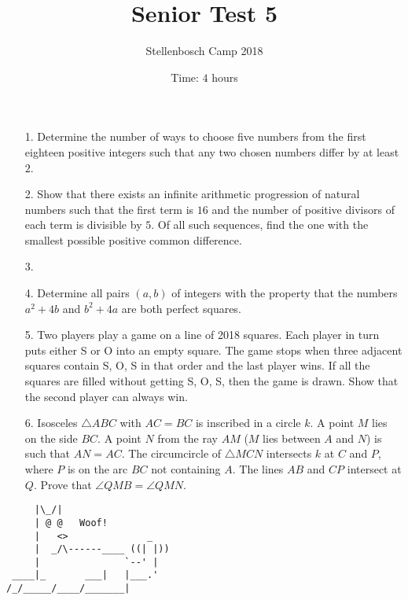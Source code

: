 \documentclass[a4paper, 12pt]{article}
\title{Senior Test 5}
\author{Stellenbosch Camp 2018}
\date{Time: $4$ hours}
\begin{document}
 \maketitle

\begin{enumerate}

\item[1.] Determine the number of ways to choose five numbers from the first eighteen positive integers such that any two chosen numbers differ by at least $2$.


\vspace{6pt}

\item[2.]  Show that there exists an infinite arithmetic progression of natural numbers such that the first term is $16$ and the number of positive divisors of each term is divisible by $5$. Of all such sequences, find the one with the smallest possible positive common difference.


\vspace{6pt}

% 
\item[3.]   


\vspace{6pt}

\item[4.] Determine all pairs $(a,b)$ of integers with the property that the numbers $a^2+4b$ and $b^2+4a$ are both perfect squares.


\vspace{6pt}

\item[5.]   Two players play a game on a line of 2018 squares. Each player in turn puts either S or O into an empty square. The game stops when three adjacent squares contain S, O, S in that order and the last player wins. If all the squares are filled without getting S, O, S, then the game is drawn. Show that the second player can always win.


\item[6.]
Isosceles $\triangle ABC$ with $AC=BC$ is inscribed in a circle $k$. A point $M$ lies on the side $BC$. A point $N$ from the ray $AM$ ($M$ lies between $A$ and $N$) is such that $AN=AC$. The circumcircle of $\triangle MCN$ intersects $k$ at $C$ and $P$, where $P$ is on the arc $BC$ not containing $A$. The lines $AB$ and $CP$ intersect at $Q$. Prove that $\angle QMB = \angle QMN$.


\end{enumerate}

\vfill

\centering
\begin{BVerbatim}
     |\_/|                  
     | @ @   Woof! 
     |   <>              _  
     |  _/\------____ ((| |))
     |               `--' |   
 ____|_       ___|   |___.' 
/_/_____/____/_______|
\end{BVerbatim}

\vspace{12mm}
\end{document}
